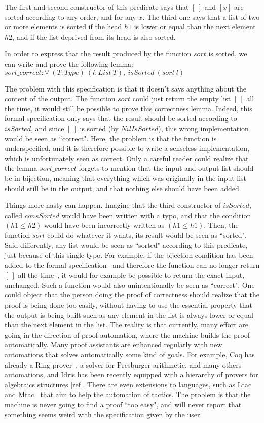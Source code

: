 The first and second constructor of this predicate says that $[\ ]$ and $[x]$ are sorted according to any order, and for any $x$. The third one says that a list of two or more elements is sorted if the head $h1$ is lower or equal than the next element $h2$, and if the list deprived from its head is also sorted.

In order to express that the result produced by the function $sort$ is sorted, we can write and prove the following lemma:
$sort\_correct : \forall\ (T:Type)\ (l:List\ T),\ isSorted\ (sort\ l)$

The problem with this specification is that it doesn't says anything about the content of the output. The function $sort$ could just return the empty list $[\ ]$ all the time, it would still be possible to prove this correctness lemma. Indeed, this formal specification only says that the result should be sorted according to $isSorted$, and since $[\ ]$ is sorted (by $NilIsSorted$), this wrong implementation would be seen as ``correct". Here, the problem is that the function is underspecified, and it is therefore possible to write a senseless implementation, which is unfortunately seen as correct. Only a careful reader could realize that the lemma $sort\_correct$ forgets to mention that the input and output list should be in bijection, meaning that everything which was originally in the input list should still be in the output, and that nothing else should have been added.

Things more nasty can happen. Imagine that the third constructor of $isSorted$, called $consSorted$ would have been written with a typo, and that the condition $(h1 \leq h2) $ would have been incorrectly written as $(h1 \leq h1)$. Then, the function $sort$ could do whatever it wants, its result would be seen as ``sorted". Said differently, any list would be seen as ``sorted" according to this predicate, just because of this single typo. For example, if the bijection condition has been added to the formal specification --and therefore the function can no longer return $[\ ]$ all the time--, it would for example be possible to return the exact input, unchanged. Such a function would also unintentionally be seen as ``correct". One could object that the person doing the proof of correctness should realize that the proof is being done too easily, without having to use the essential property that the output is being built such as any element in the list is always lower or equal than the next element in the list. The reality is that currently, many effort are going in the direction of proof automation, where the machine builds the proof automatically. Many proof assistants are enhanced regularly with new automations that solves automatically some kind of goals. For example, Coq has already a Ring prover~\cite{coq2005}, a solver for Presburger arithmetic, and many others automations, and Idris has been recently equipped with a hierarchy of provers for algebraics structures [ref]. There are even extensions to languages, such as Ltac~\cite{DelahayeLTac} and Mtac~\cite{Ziliani13} that aim to help the automation of tactics. The problem is that the machine is never going to find a proof ``too easy", and will never report that something seems weird with the specification given by the user.

